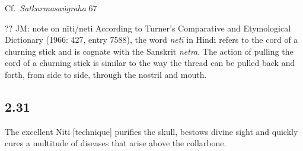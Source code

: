 \begin{ekdosis}
\begin{testimonia}[hp02_030]
\begin{versinnote}
\end{versinnote}

Cf.~\emph{Satkarmasaṅgraha} 67

\begin{versinnote}
\end{versinnote}
\end{testimonia}

\begin{philcomm}[hp02_030]
?? JM: note on nīti/neti   According to Turner’s Comparative and Etymological Dictionary (1966: 427, entry 7588), the word \emph{netī} in Hindi refers to the cord of a churning stick and is cognate with the Sanskrit \emph{netra}. The action of pulling the cord of a churning stick is similar to the way the thread can be pulled back and forth, from side to side, through the nostril and mouth. 

\end{philcomm}
\subsection*{2.31}
\begin{translation}[hp02_031]
The excellent Niti [technique] purifies the skull, bestows divine sight and quickly cures a multitude of diseases that arise above the collarbone.
\end{translation}


\end{ekdosis}
